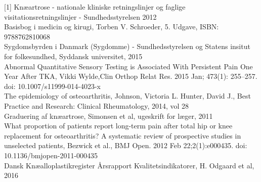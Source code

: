 [1] Knæartrose - nationale kliniske retningslinjer og faglige visitationsretningslinjer - Sundhedsstyrelsen 2012 \\
[2] Basisbog i medicin og kirugi, Torben V. Schroeder, 5. Udgave, ISBN: 9788762810068\\
[3] Sygdomsbyrden i Danmark (Sygdomme) - Sundhedsstyrelsen og Statens insitut for folkesundhed, Syddansk universitet, 2015\\
[4]Abnormal Quantitative Sensory Testing is Associated With Persistent Pain One Year After TKA, Vikki Wylde,Clin Orthop Relat Res. 2015 Jan; 473(1): 255–257.  doi:  10.1007/s11999-014-4023-x \\
[5] The epidemiology of osteoarthritis, Johnson, Victoria L.
Hunter, David J., Best Practice and Research: Clinical Rheumatology, 2014, vol 28 \\
[10] Graduering af knæartrose, Simonsen et al,  ugeskrift for læger, 2011\\
[11] What proportion of patients report long-term pain after total hip or knee replacement for osteoarthritis? A systematic review of prospective studies in unselected patients, Bezwick et al., BMJ Open. 2012 Feb 22;2(1):e000435. doi: 10.1136/bmjopen-2011-000435 \\
[12] Dansk Knæalloplastikregister Årsrapport Kvalitetsindikatorer, H. Odgaard et al, 2016
